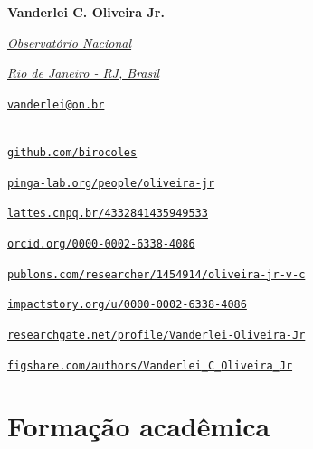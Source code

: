 \parbox{0.03\textwidth}{\vspace{-0.1\baselineskip}\faUser} \textbf{Vanderlei C. Oliveira Jr.}\\
\parbox{0.03\textwidth}{\vspace{-0.2\baselineskip}\faUniversity} \href{https://www.gov.br/observatorio/pt-br}{\textsl{Observatório Nacional}}\\
\parbox{0.03\textwidth}{\faMapMarker} \href{https://g.page/observatorionacional?share}{\textit{Rio de Janeiro - RJ, Brasil}}\\
\parbox{0.03\textwidth}{\faEnvelope} \href{mailto:vanderlei@on.br}{\texttt{vanderlei@on.br}}\\\\
\parbox{0.03\textwidth}{\faGithub} \href{https://github.com/birocoles}{\footnotesize \texttt{github.com/birocoles}}\\
\parbox{0.03\textwidth}{\faUsers} \href{https://www.pinga-lab.org/people/oliveira-jr.html}{\footnotesize \texttt{pinga-lab.org/people/oliveira-jr}}\\
\parbox{0.03\textwidth}{\aiLattes} \href{https://lattes.cnpq.br/4332841435949533}{\footnotesize \texttt{lattes.cnpq.br/4332841435949533}}\\
\parbox{0.03\textwidth}{\aiOrcid} \href{https://orcid.org/0000-0002-6338-4086}{\footnotesize \texttt{orcid.org/0000-0002-6338-4086}}\\
\parbox{0.03\textwidth}{\aiPublonsSquare} \href{https://publons.com/researcher/1454914/oliveira-jr-v-c/}{\footnotesize  \texttt{publons.com/researcher/1454914/oliveira-jr-v-c}}\\
\parbox{0.03\textwidth}{\aiImpactstory} \href{https://impactstory.org/u/0000-0002-6338-4086}{\footnotesize \texttt{impactstory.org/u/0000-0002-6338-4086}}\\
\parbox{0.03\textwidth}{\aiResearchGateSquare} \href{https://www.researchgate.net/profile/Vanderlei-Oliveira-Jr}{\footnotesize \texttt{researchgate.net/profile/Vanderlei-Oliveira-Jr}}\\
\parbox{0.03\textwidth}{\aiFigshare} \href{https://figshare.com/authors/Vanderlei_C_Oliveira_Jr/387579}{\footnotesize \texttt{figshare.com/authors/Vanderlei{\_}C{\_}Oliveira{\_}Jr}}


\section{Formação acadêmica}


